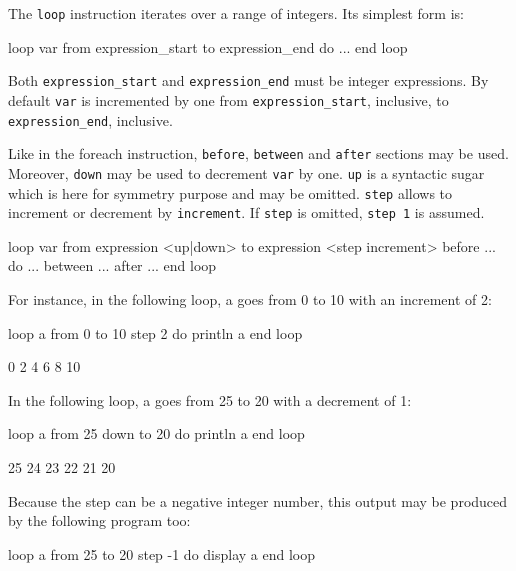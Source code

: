 \documentclass[10pt,openright,twosides,final]{memoir}
\newcommand{\var}[1]{{\small\ttfamily #1}}
\newcommand{\gtlinline}[1]{\colorbox{light-blue}{\lstinline[language=gtl]{#1}}}
\begin{document}
The \gtlinline{loop} instruction iterates over a range of integers. Its simplest form is:

\begin{gtl}
loop var from expression_start to expression_end do
  ...
end loop
\end{gtl}

Both \gtlinline{expression_start} and \gtlinline{expression_end} must be integer expressions. By default \gtlinline{var} is incremented by one from \gtlinline{expression_start}, inclusive, to \gtlinline{expression_end}, inclusive. 

Like in the foreach instruction, \gtlinline{before},  \gtlinline{between} and \gtlinline{after} sections may be used. Moreover, \gtlinline{down} may be used to decrement \gtlinline{var} by one. \gtlinline{up} is a syntactic sugar which is here for symmetry purpose and may be omitted. \gtlinline{step} allows to increment or decrement by \gtlinline{increment}. If \gtlinline{step} is omitted, \gtlinline{step 1} is assumed.

\begin{gtl}
loop var from expression <up|down> to expression <step increment>
  before ...
  do ...
  between ...
  after ...
end loop
\end{gtl}

\noindent For instance, in the following loop, \var{a} goes from 0 to 10 with an increment of 2:

\begin{gtl}
loop a from 0 to 10 step 2 do
  println a
end loop
\end{gtl}

\begin{console}
0
2
4
6
8
10
\end{console}

\noindent In the following loop, \var{a} goes from 25 to 20 with a decrement of 1:

\begin{gtl}
loop a from 25 down to 20 do
  println a
end loop
\end{gtl}

\begin{console}
25
24
23
22
21
20
\end{console}

\noindent Because the step can be a negative integer number, this output may be produced by the following program too:

\begin{gtl}
loop a from 25 to 20 step -1 do
  display a
end loop
\end{gtl}
\end{document}
